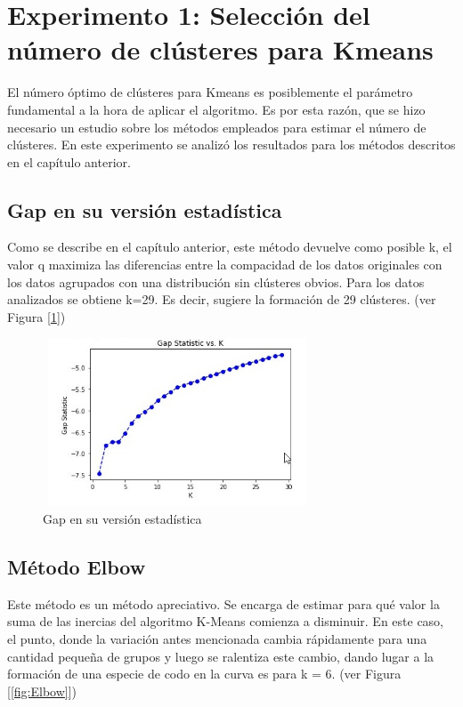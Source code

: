 \section{Experimento 1: Selección del número de clústeres para Kmeans}
El número óptimo de clústeres para Kmeans es posiblemente el parámetro fundamental a la hora de aplicar el algoritmo. Es por esta razón, que se hizo necesario un estudio sobre los métodos empleados para estimar el número de clústeres. En este experimento se analizó los resultados para los métodos descritos en el capítulo anterior.

\subsection{Gap en su versión estadística}
Como se describe en el capítulo anterior, este método devuelve como posible k, el valor q maximiza las diferencias entre la compacidad de los datos originales con los datos agrupados con una distribución sin clústeres obvios. Para los datos analizados se obtiene k=29. Es decir, sugiere la formación de 29 clústeres. (ver Figura [\ref*{fig:Gap}])


\begin{figure}[h!]
	\centering
	\includegraphics[width=8cm, height=5cm]{Images/Gap_Static.jpg} 
	\caption{Gap en su versión estadística }
	\label{fig:Gap}
\end{figure}

\subsection{Método Elbow}
Este método es un método apreciativo. Se encarga de estimar para qué valor la suma de las inercias del algoritmo K-Means comienza a disminuir. En este caso, el punto, donde la variación antes mencionada cambia rápidamente para una cantidad pequeña de grupos y luego se ralentiza este cambio, dando lugar a la formación de una especie de codo en la curva es para k = 6. (ver Figura [\ref*{fig:Elbow}])

